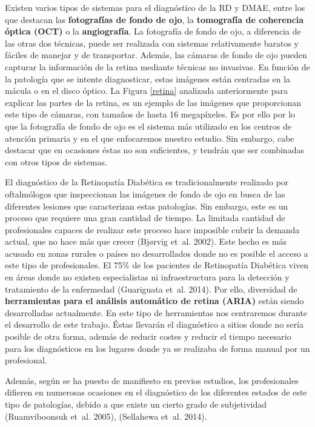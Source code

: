 \documentclass[
  12pt,
  spanish,
  a4paperpaper,
]{report}
\begin{document}
Existen varios tipos de sistemas para el diagnóstico de la RD y DMAE,
entre los que destacan las \textbf{fotografías de fondo de ojo}, la
\textbf{tomografía de coherencia óptica (OCT)} o la
\textbf{angiografía}. La fotografía de fondo de ojo, a diferencia de las
otras dos técnicas, puede ser realizada con sistemas relativamente
baratos y fáciles de manejar y de transportar. Además, las cámaras de
fondo de ojo pueden capturar la información de la retina mediante
técnicas no invasivas. En función de la patología que se intente
diagnosticar, estas imágenes están centradas en la mácula o en el disco
óptico. La Figura \ref{retina} analizada anteriormente para explicar las
partes de la retina, es un ejemplo de las imágenes que proporcionan este
tipo de cámaras, con tamaños de hasta 16 megapíxeles. Es por ello por lo
que la fotografía de fondo de ojo es el sistema más utilizado en los
centros de atención primaria y en el que enfocaremos nuestro estudio.
Sin embargo, cabe destacar que en ocasiones éstas no son suficientes, y
tendrán que ser combinadas con otros tipos de sistemas.

El diagnóstico de la Retinopatía Diabética es tradicionalmente realizado
por oftalmólogos que inspeccionan las imágenes de fondo de ojo en busca
de las diferentes lesiones que caracterizan estas patologías. Sin
embargo, este es un proceso que requiere una gran cantidad de tiempo. La
limitada cantidad de profesionales capaces de realizar este proceso hace
imposible cubrir la demanda actual, que no hace más que crecer (Bjørvig
et~al. 2002). Este hecho es más acusado en zonas rurales o países no
desarrollados donde no es posible el acceso a este tipo de
profesionales. El 75\% de los pacientes de Retinopatía Diabética viven
en áreas donde no existen especialistas ni infraestructura para la
detección y tratamiento de la enfermedad (Guariguata et~al. 2014). Por
ello, diversidad de \textbf{herramientas para el análisis automático de
retina (ARIA)} están siendo desarrolladas actualmente. En este tipo de
herramientas nos centraremos durante el desarrollo de este trabajo.
Éstas llevarán el diagnóstico a sitios donde no sería posible de otra
forma, además de reducir costes y reducir el tiempo necesario para los
diagnósticos en los lugares donde ya se realizaba de forma manual por un
profesional.

Además, según se ha puesto de manifiesto en previos estudios, los
profesionales difieren en numerosas ocasiones en el diagnóstico de los
diferentes estados de este tipo de patologías, debido a que existe un
cierto grado de subjetividad (Ruamviboonsuk et~al. 2005), (Sellahewa
et~al. 2014).
\end{document}
